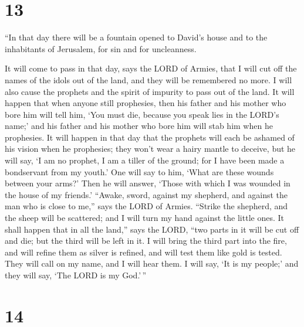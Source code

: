 \hypertarget{section-12}{%
\section{13}\label{section-12}}

 ``In that day there will be a fountain opened to David's
house and to the inhabitants of Jerusalem, for sin and for uncleanness.

 It will come to pass in that day, says the LORD of Armies,
that I will cut off the names of the idols out of the land, and they
will be remembered no more. I will also cause the prophets and the
spirit of impurity to pass out of the land.  It will happen
that when anyone still prophesies, then his father and his mother who
bore him will tell him, `You must die, because you speak lies in the
LORD's name;' and his father and his mother who bore him will stab him
when he prophesies.  It will happen in that day that the
prophets will each be ashamed of his vision when he prophesies; they
won't wear a hairy mantle to deceive,  but he will say, `I
am no prophet, I am a tiller of the ground; for I have been made a
bondservant from my youth.'  One will say to him, `What are
these wounds between your arms?' Then he will answer, `Those with which
I was wounded in the house of my friends.'  ``Awake, sword,
against my shepherd, and against the man who is close to me,'' says the
LORD of Armies. ``Strike the shepherd, and the sheep will be scattered;
and I will turn my hand against the little ones.  It shall
happen that in all the land,'' says the LORD, ``two parts in it will be
cut off and die; but the third will be left in it.  I will
bring the third part into the fire, and will refine them as silver is
refined, and will test them like gold is tested. They will call on my
name, and I will hear them. I will say, `It is my people;' and they will
say, `The LORD is my God.'\,''

\hypertarget{section-13}{%
\section{14}\label{section-13}}

